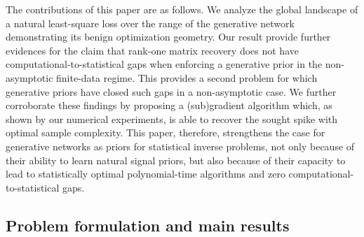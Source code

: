 The contributions of this paper are as follows.  We
analyze the global landscape of a natural least-square loss over the range of the generative network demonstrating its benign optimization geometry. Our result provide further evidences for the claim that rank-one matrix recovery 
does not have  computational-to-statistical gaps when enforcing a generative prior in the non-asymptotic finite-data regime. This provides a second problem for which generative priors have closed such gaps in a non-asymptotic case.  
We further corroborate these findings by proposing a (sub)gradient algorithm which, as shown by our numerical experiments, is able to recover the sought spike with optimal sample complexity. 
This paper, therefore, strengthens the case for generative networks as priors for statistical inverse problems, not only because of their ability to learn natural signal priors, but also because of their capacity to lead to statistically optimal polynomial-time algorithms and zero computational-to-statistical gaps. 

\subsection{Problem formulation and main results}\label{sec:informal}

